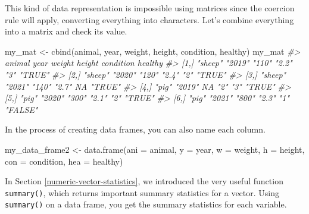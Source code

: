 \documentclass[
]{book}
\newenvironment{Shaded}{\begin{snugshade}}{\end{snugshade}}
\newcommand{\AttributeTok}[1]{\textcolor[rgb]{0.77,0.63,0.00}{#1}}
\newcommand{\CommentTok}[1]{\textcolor[rgb]{0.56,0.35,0.01}{\textit{#1}}}
\newcommand{\FunctionTok}[1]{\textcolor[rgb]{0.00,0.00,0.00}{#1}}
\newcommand{\NormalTok}[1]{#1}
\newcommand{\OtherTok}[1]{\textcolor[rgb]{0.56,0.35,0.01}{#1}}
\newenvironment{blackbox}{
  \definecolor{shadecolor}{rgb}{0, 0, 0}  %
  \color{white}
  \begin{shaded}}
 {\end{shaded}}
\newenvironment{infobox}[1]
  {
  \begin{itemize}
  \renewcommand{\labelitemi}{
    \raisebox{-.7\height}[0pt][0pt]{
      {\setkeys{Gin}{width=3em,keepaspectratio}
        \texttt{[image: pics/\#1]}}
    }
  }
  \setlength{\fboxsep}{1em}
  \begin{blackbox}
  \item
  }
  {
  \end{blackbox}
  \end{itemize}
  }
\begin{document}
\begin{infobox}{caution}

This kind of data representation is impossible using matrices since the coercion rule will apply, converting everything into characters. Let's combine everything into a matrix and check its value.

\begin{Shaded}
\begin{Highlighting}[]
\NormalTok{my\_mat }\OtherTok{\textless{}{-}} \FunctionTok{cbind}\NormalTok{(animal, year, weight, height, condition, healthy)}
\NormalTok{my\_mat}
\CommentTok{\#\textgreater{}      animal  year   weight height condition healthy}
\CommentTok{\#\textgreater{} [1,] "sheep" "2019" "110"  "2.2"  "3"       "TRUE" }
\CommentTok{\#\textgreater{} [2,] "sheep" "2020" "120"  "2.4"  "2"       "TRUE" }
\CommentTok{\#\textgreater{} [3,] "sheep" "2021" "140"  "2.7"  NA        "TRUE" }
\CommentTok{\#\textgreater{} [4,] "pig"   "2019" NA     "2"    "3"       "TRUE" }
\CommentTok{\#\textgreater{} [5,] "pig"   "2020" "300"  "2.1"  "2"       "TRUE" }
\CommentTok{\#\textgreater{} [6,] "pig"   "2021" "800"  "2.3"  "1"       "FALSE"}
\end{Highlighting}
\end{Shaded}

\end{infobox}

In the process of creating data frames, you can also name each column.

\begin{Shaded}
\begin{Highlighting}[]
\NormalTok{my\_data\_frame2 }\OtherTok{\textless{}{-}} \FunctionTok{data.frame}\NormalTok{(}\AttributeTok{ani =}\NormalTok{ animal, }\AttributeTok{y =}\NormalTok{ year, }\AttributeTok{w =}\NormalTok{ weight, }\AttributeTok{h =}\NormalTok{ height, }\AttributeTok{con =}\NormalTok{ condition, }\AttributeTok{hea =}\NormalTok{ healthy)}
\end{Highlighting}
\end{Shaded}

In Section \ref{numeric-vector-statistics}, we introduced the very useful function \texttt{summary()}, which returns important summary statistics for a vector. Using \texttt{summary()} on a data frame, you get the summary statistics for each variable.
\end{document}
